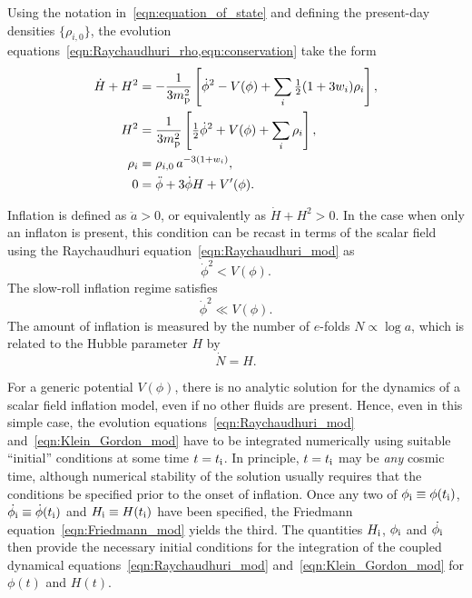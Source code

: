 Using the notation in~\eqref{eqn:equation_of_state} and defining the present-day densities $\{\rho_{i,0}\}$, the evolution equations~\eqref{eqn:Raychaudhuri_rho,eqn:conservation} take the form 
%
\begin{align}
  \dot{H}+H^2 &= 
  -\frac{1}{3m_{\mathrm{p}}^2}\left[\dot{\phi}^2 - V(\phi) +
  \sum_i{\textstyle\frac{1}{2}}(1+3w_i)\rho_i\right] ,
  \label{eqn:Raychaudhuri_mod}
  \\
  H^2 &= 
  \frac{1}{3m_{\mathrm{p}}^2}\left[{\textstyle\frac{1}{2}}\dot{\phi}^2 + V(\phi) +
  \sum_i\rho_i\right],
  \label{eqn:Friedmann_mod} 
  \\
  \rho_i &= 
  \rho_{i,0} \,a^{-3(1+w_i)},
  \label{eqn:rho_a} 
  \\ 
  0&= 
  \ddot{\phi} +3\dot{\phi}H + V^\prime(\phi).
  \label{eqn:Klein_Gordon_mod}
\end{align}
%                                                          

Inflation is defined as $\ddot{a}>0$, or equivalently as $\dot{H}+H^2>0$. In the case when only an inflaton is present, this condition can be recast in terms of the scalar field using the Raychaudhuri equation~\eqref{eqn:Raychaudhuri_mod} as
%
\begin{equation}
  \dot{\phi}^2<V(\phi).
  \label{eqn:Onset_inflation}
\end{equation}
%
The slow-roll inflation regime satisfies
%
\begin{equation}
  \dot{\phi}^2\ll V(\phi).
  \label{eqn:Slow-roll}
\end{equation}
%
The amount of inflation is measured by the number of $e$-folds $N\propto \log a$, which is related to the Hubble parameter $H$ by
%
\begin{equation}
  \dot{N}=H.\label{eqn:e-folds}
\end{equation}
%

For a generic potential $V(\phi)$, there is no analytic solution for the dynamics of a scalar field inflation model, even if no other fluids are present. Hence, even in this simple case, the evolution equations~\eqref{eqn:Raychaudhuri_mod} and~\eqref{eqn:Klein_Gordon_mod} have to be integrated numerically using suitable ``initial'' conditions at some time $t=t_{\mathrm{i}}$. In principle, $t=t_{\mathrm{i}}$ may be {\em any\/} cosmic time, although numerical stability of the solution usually requires that the conditions be specified prior to the onset of inflation.  Once any two of $\phi_{\mathrm{i}} \equiv \phi(t_{\mathrm{i}})$, $\dot{\phi_{\mathrm{i}}} \equiv \dot{\phi}(t_{\mathrm{i}})$ and $H_{\mathrm{i}} \equiv H(t_{\mathrm{i}})$ have been specified, the Friedmann equation~\eqref{eqn:Friedmann_mod} yields the third. The quantities $H_{\mathrm{i}}$, $\phi_{\mathrm{i}}$ and $\dot{\phi_{\mathrm{i}}}$ then provide the necessary initial conditions for the integration of the coupled dynamical equations~\eqref{eqn:Raychaudhuri_mod} and~\eqref{eqn:Klein_Gordon_mod} for $\phi(t)$ and $H(t)$.


